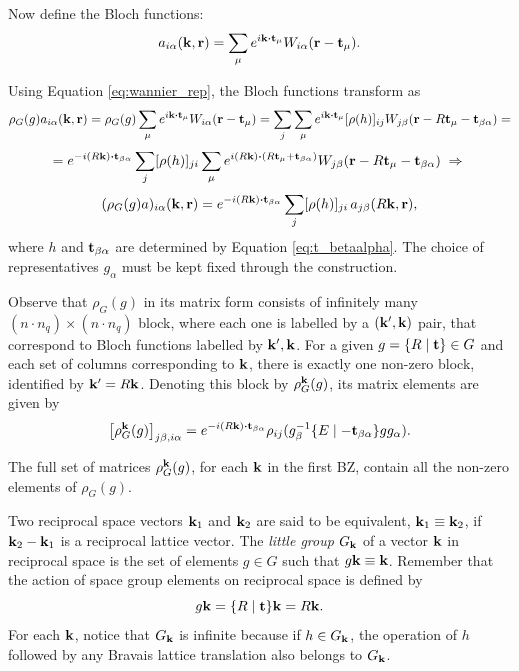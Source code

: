 \documentclass[12pt]{report}
\begin{document}
\n

Now define the Bloch functions:
\begin{equation} \label{eq:bloch_functions}
a_{i\alpha}(\k, \r) = \sum_{\mu} e^{i\k\vdot\t_\mu} W_{i\alpha}(\r-\t_\mu).
\end{equation}

Using Equation \ref{eq:wannier_rep}, the Bloch functions transform as
$$
\rho_G(g) a_{i\alpha}(\k,\r) =
\rho_G(g) \sum_{\mu} e^{i\k\vdot\t_\mu} W_{i\alpha}(\r-\t_\mu) =
\sum_{j} \sum_{\mu} e^{i\k\vdot\t_\mu} [\rho(h)]_{ij} W_{j\beta}(\r-R\t_\mu-\t_{\beta\alpha}) =
$$
$$
= e^{-i(R\k)\vdot\t_{\beta\alpha}} \sum_{j} [\rho(h)]_{ji} \sum_{\mu} e^{i(R\k)\vdot(R\t_\mu+\t_{\beta\alpha})} W_{j\beta}(\r-R\t_\mu-\t_{\beta\alpha}) \implies
$$
\begin{equation} \label{eq:bloch_rep}
(\rho_G(g) a)_{i\alpha}(\k,\r) = e^{-i(R\k)\vdot\t_{\beta\alpha}} \sum_{j} [\rho(h)]_{ji} \, a_{j\beta}(R\k, \r),
\end{equation}
where $h$ and ${\vb{t}}_{\beta\alpha}$ are determined by Equation \ref{eq:t_betaalpha}. The choice of representatives $g_\alpha$ must be kept fixed through the construction.

Observe that $\rho_G(g)$ in its matrix form consists of infinitely many $(n\cdot n_q)\times (n\cdot n_q)$ block, where each one is labelled by a $({\vb{k}}', {\vb{k}})$ pair, that correspond to Bloch functions labelled by ${\vb{k}}', {\vb{k}}$. For a given $g = \{ R \mid {\vb{t}} \} \in G$ and each set of columns corresponding to ${\vb{k}}$, there is exactly one non-zero block, identified by ${\vb{k}}' = R{\vb{k}}$. Denoting this block by $\rho_G^{\vb{k}}(g)$, its matrix elements are given by
$$
\qty[\rho_G^\k(g)]_{j\beta,i\alpha} = e^{-i(R\k)\vdot\t_{\beta\alpha}}\rho_{ij}(g_\beta^{-1}\sg{E}{-\t_{\beta\alpha}}gg_\alpha).
$$

The full set of matrices $\rho_G^{\vb{k}}(g)$, for each ${\vb{k}}$ in the first BZ, contain all the non-zero elements of $\rho_G(g)$.


\begin{definition}
Two reciprocal space vectors ${\vb{k}}_1$ and ${\vb{k}}_2$ are said to be equivalent, ${\vb{k}}_1 \equiv {\vb{k}}_2$, if ${\vb{k}}_2 - {\vb{k}}_1$ is a reciprocal lattice vector. The \textit{little group} $G_{\vb{k}}$ of a vector ${\vb{k}}$ in reciprocal space is the set of elements $g \in G$ such that $g {\vb{k}} \equiv {\vb{k}}$. Remember that the action of space group elements on reciprocal space is defined by
$$
g{\vb{k}} = \{ R \mid {\vb{t}} \}{\vb{k}} = R{\vb{k}}.
$$
For each ${\vb{k}}$, notice that $G_{\vb{k}}$ is infinite because if $h \in G_{\vb{k}}$, the operation of $h$ followed by any Bravais lattice translation also belongs to $G_{\vb{k}}$.
\end{definition}
\end{document}
